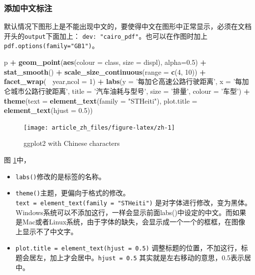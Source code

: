 \documentclass[]{article}
\newenvironment{Shaded}{\begin{snugshade}}{\end{snugshade}}
\newcommand{\DataTypeTok}[1]{\textcolor[rgb]{0.13,0.29,0.53}{#1}}
\newcommand{\DecValTok}[1]{\textcolor[rgb]{0.00,0.00,0.81}{#1}}
\newcommand{\FloatTok}[1]{\textcolor[rgb]{0.00,0.00,0.81}{#1}}
\newcommand{\KeywordTok}[1]{\textcolor[rgb]{0.13,0.29,0.53}{\textbf{#1}}}
\newcommand{\NormalTok}[1]{#1}
\newcommand{\OperatorTok}[1]{\textcolor[rgb]{0.81,0.36,0.00}{\textbf{#1}}}
\newcommand{\StringTok}[1]{\textcolor[rgb]{0.31,0.60,0.02}{#1}}
\providecommand{\tightlist}{%
  \setlength{\itemsep}{0pt}\setlength{\parskip}{0pt}}
\begin{document}
\subsubsection{添加中文标注}

默认情况下图形上是不能出现中文的，要使得中文在图形中正常显示，必须在文档开头的\texttt{output}下面加上：
\texttt{dev:\ "cairo\_pdf"}。也可以在作图时加上\texttt{pdf.options(family="GB1")}。

\begin{Shaded}
\begin{Highlighting}[]
\NormalTok{p }\OperatorTok{+}\StringTok{ }\KeywordTok{geom_point}\NormalTok{(}\KeywordTok{aes}\NormalTok{(}\DataTypeTok{colour =}\NormalTok{ class, }\DataTypeTok{size =}\NormalTok{ displ), }\DataTypeTok{alpha=}\FloatTok{0.5}\NormalTok{) }\OperatorTok{+}
\StringTok{  }\KeywordTok{stat_smooth}\NormalTok{() }\OperatorTok{+}\StringTok{ }\KeywordTok{scale_size_continuous}\NormalTok{(}\DataTypeTok{range =} \KeywordTok{c}\NormalTok{(}\DecValTok{4}\NormalTok{, }\DecValTok{10}\NormalTok{)) }\OperatorTok{+}
\StringTok{  }\KeywordTok{facet_wrap}\NormalTok{(}\OperatorTok{~}\StringTok{ }\NormalTok{year,}\DataTypeTok{ncol =} \DecValTok{1}\NormalTok{) }\OperatorTok{+}
\StringTok{  }\KeywordTok{labs}\NormalTok{(}\DataTypeTok{y =} \StringTok{'每加仑高速公路行驶距离'}\NormalTok{, }\DataTypeTok{x =} \StringTok{'每加仑城市公路行驶距离'}\NormalTok{,}
       \DataTypeTok{title =} \StringTok{'汽车油耗与型号'}\NormalTok{, }\DataTypeTok{size =} \StringTok{'排量'}\NormalTok{, }\DataTypeTok{colour =} \StringTok{'车型'}\NormalTok{) }\OperatorTok{+}
\StringTok{  }\KeywordTok{theme}\NormalTok{(}\DataTypeTok{text =} \KeywordTok{element_text}\NormalTok{(}\DataTypeTok{family =} \StringTok{"STHeiti"}\NormalTok{),}
        \DataTypeTok{plot.title =} \KeywordTok{element_text}\NormalTok{(}\DataTypeTok{hjust =} \FloatTok{0.5}\NormalTok{))}
\end{Highlighting}
\end{Shaded}

\begin{figure}

{\centering \texttt{[image: article\_zh\_files/figure-latex/zh-1]} 

}

\caption{ggplot2 with Chinese characters}\label{fig:zh}
\end{figure}

图 \ref{fig:zh}中，

\begin{itemize}
\tightlist
\item
  \texttt{labs()}修改的是标签的名称。
\item
  \texttt{theme()}主题，更偏向于格式的修改。\texttt{text\ =\ element\_text(family\ =\ "STHeiti")}
  是对字体进行修改，变为黑体。Windows系统可以不添加这行，一样会显示前面labs()中设定的中文。而如果是Mac或者Linux系统，由于字体的缺失，会显示成一个一个的框框，在图像上显示不了中文字。
\item
  \texttt{plot.title\ =\ element\_text(hjust\ =\ 0.5)}
  调整标题的位置，不加这行，标题会居左，加上才会居中。\texttt{hjust\ =\ 0.5}
  其实就是左右移动的意思，0.5表示居中。
\end{itemize}
\end{document}
